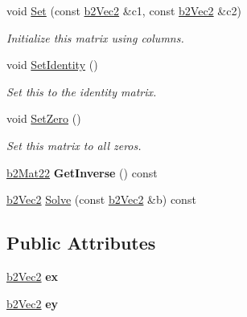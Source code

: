 \begin{DoxyCompactItemize}
\mbox{\label{structb2Mat22_aed3bee1de38a0b3f36e21c90faa24112}} 
void \hyperlink{structb2Mat22_aed3bee1de38a0b3f36e21c90faa24112}{Set} (const \hyperlink{structb2Vec2}{b2\+Vec2} \&c1, const \hyperlink{structb2Vec2}{b2\+Vec2} \&c2)
\begin{DoxyCompactList}\small\item\em Initialize this matrix using columns. \end{DoxyCompactList}\item 
\mbox{\label{structb2Mat22_a7192f063b771ac9ded060e41df890509}} 
void \hyperlink{structb2Mat22_a7192f063b771ac9ded060e41df890509}{Set\+Identity} ()
\begin{DoxyCompactList}\small\item\em Set this to the identity matrix. \end{DoxyCompactList}\item 
\mbox{\label{structb2Mat22_aaeae95f61cf3171ffb94703980e3594b}} 
void \hyperlink{structb2Mat22_aaeae95f61cf3171ffb94703980e3594b}{Set\+Zero} ()
\begin{DoxyCompactList}\small\item\em Set this matrix to all zeros. \end{DoxyCompactList}\item 
\mbox{\label{structb2Mat22_ad0b0676deea081b761c67be48e0ac850}} 
\hyperlink{structb2Mat22}{b2\+Mat22} {\bfseries Get\+Inverse} () const
\item 
\hyperlink{structb2Vec2}{b2\+Vec2} \hyperlink{structb2Mat22_a3313c8d135c01fbf74e7fea31f1ea4c1}{Solve} (const \hyperlink{structb2Vec2}{b2\+Vec2} \&b) const
\end{DoxyCompactItemize}
\subsection*{Public Attributes}
\begin{DoxyCompactItemize}
\item 
\mbox{\label{structb2Mat22_abaffa5fc1d401ea36415acffa6205689}} 
\hyperlink{structb2Vec2}{b2\+Vec2} {\bfseries ex}
\item 
\mbox{\label{structb2Mat22_af19db58941d2cd146325ef3191b776fd}} 
\hyperlink{structb2Vec2}{b2\+Vec2} {\bfseries ey}
\end{DoxyCompactItemize}


